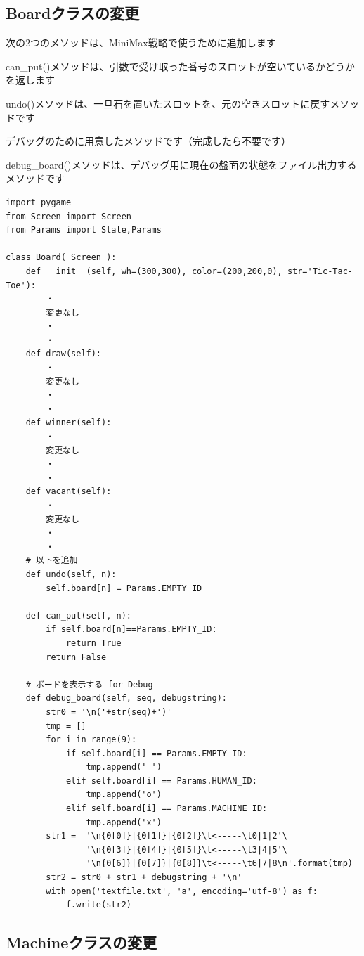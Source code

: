\documentclass[uplatex,a4paper,11pt,oneside,openany]{jsbook}
\begin{document}
\subsection{Boardクラスの変更}

次の2つのメソッドは、MiniMax戦略で使うために追加します

can\_put()メソッドは、引数で受け取った番号のスロットが空いているかどうかを返します

undo()メソッドは、一旦石を置いたスロットを、元の空きスロットに戻すメソッドです

デバッグのために用意したメソッドです（完成したら不要です）

debug\_board()メソッドは、デバッグ用に現在の盤面の状態をファイル出力するメソッドです

\begin{lstlisting}[caption=Board.py,label=minimax04]
import pygame
from Screen import Screen
from Params import State,Params

class Board( Screen ):
    def __init__(self, wh=(300,300), color=(200,200,0), str='Tic-Tac-Toe'):
        ・
        変更なし
        ・
        ・
    def draw(self):
        ・
        変更なし
        ・
        ・
    def winner(self):
        ・
        変更なし
        ・
        ・
    def vacant(self):
        ・
        変更なし
        ・
        ・
    # 以下を追加
    def undo(self, n):
        self.board[n] = Params.EMPTY_ID

    def can_put(self, n):
        if self.board[n]==Params.EMPTY_ID:
            return True
        return False

    # ボードを表示する for Debug
    def debug_board(self, seq, debugstring):
        str0 = '\n('+str(seq)+')'
        tmp = []
        for i in range(9):
            if self.board[i] == Params.EMPTY_ID:
                tmp.append(' ')
            elif self.board[i] == Params.HUMAN_ID:
                tmp.append('o')
            elif self.board[i] == Params.MACHINE_ID:
                tmp.append('x')
        str1 =  '\n{0[0]}|{0[1]}|{0[2]}\t<-----\t0|1|2'\
                '\n{0[3]}|{0[4]}|{0[5]}\t<-----\t3|4|5'\
                '\n{0[6]}|{0[7]}|{0[8]}\t<-----\t6|7|8\n'.format(tmp)
        str2 = str0 + str1 + debugstring + '\n'
        with open('textfile.txt', 'a', encoding='utf-8') as f:
            f.write(str2)
\end{lstlisting}

\subsection{Machineクラスの変更}
\end{document}
